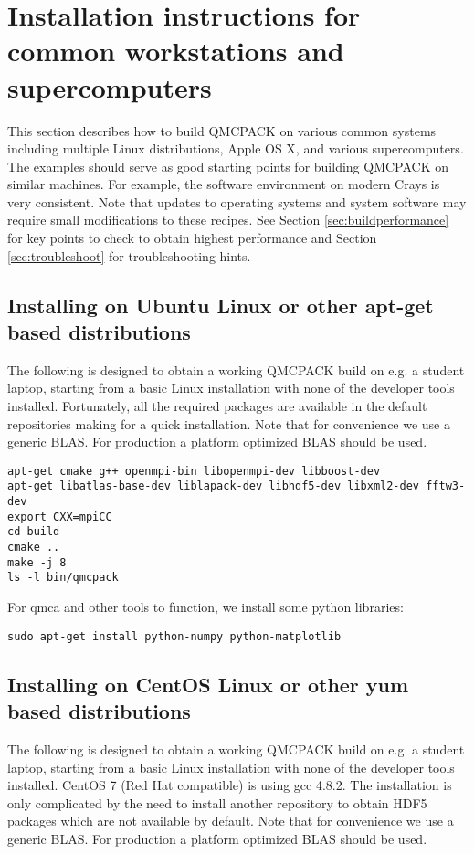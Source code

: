 \section{Installation instructions for common workstations and
  supercomputers}
\label{sec:installexamples}

This section describes how to build QMCPACK on various common systems
including multiple Linux distributions, Apple OS X, and various
supercomputers. The examples should serve as good starting points for
building QMCPACK on similar machines. For example, the software
environment on modern Crays is very consistent. Note that updates to
operating systems and system software may require small modifications
to these recipes. See Section \ref{sec:buildperformance} for key
points to check to obtain highest performance and
Section \ref{sec:troubleshoot} for troubleshooting hints.

\subsection{Installing on Ubuntu Linux or other apt-get based distributions}
\label{sec:buildubuntu}

The following is designed to obtain a working QMCPACK build on e.g. a
student laptop, starting from a basic Linux installation with none of
the developer tools installed. Fortunately, all the required packages
are available in the default repositories making for a quick
installation. Note that for convenience we use a generic BLAS. For
production a platform optimized BLAS should be used.

\begin{verbatim}
apt-get cmake g++ openmpi-bin libopenmpi-dev libboost-dev
apt-get libatlas-base-dev liblapack-dev libhdf5-dev libxml2-dev fftw3-dev
export CXX=mpiCC
cd build
cmake ..
make -j 8
ls -l bin/qmcpack
\end{verbatim}

For qmca and other tools to function, we install some python libraries:
\begin{verbatim}
sudo apt-get install python-numpy python-matplotlib
\end{verbatim}

\subsection{Installing on CentOS Linux or other yum based distributions}

The following is designed to obtain a working QMCPACK build on e.g. a
student laptop, starting from a basic Linux installation with none of
the developer tools installed. CentOS 7 (Red Hat compatible) is using
gcc 4.8.2. The installation is only complicated by the need to install
another repository to obtain HDF5 packages which are not available by
default. Note that for convenience we use a generic BLAS. For
production a platform optimized BLAS should be used.

